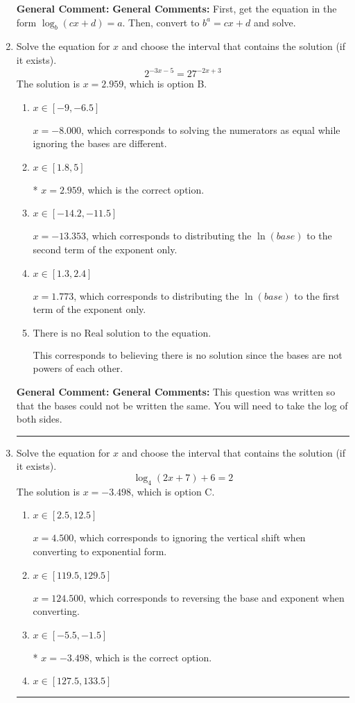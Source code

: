 \documentclass{extbook}[14pt]
\newcommand{\litem}[1]{\item #1

\rule{\textwidth}{0.4pt}}
\begin{document}
\begin{enumerate}
{\textbf{General Comment:} \textbf{General Comments:} First, get the equation in the form $\log_b{(cx+d)} = a$. Then, convert to $b^a = cx+d$ and solve.
}
\litem{
Solve the equation for $x$ and choose the interval that contains the solution (if it exists).
\[ 2^{-3x-5} = 27^{-2x+3} \]The solution is \( x = 2.959 \), which is option B.\begin{enumerate}[label=\Alph*.]
\item \( x \in [-9, -6.5] \)

$x = -8.000$, which corresponds to solving the numerators as equal while ignoring the bases are different.
\item \( x \in [1.8, 5] \)

* $x = 2.959$, which is the correct option.
\item \( x \in [-14.2, -11.5] \)

$x = -13.353$, which corresponds to distributing the $\ln(base)$ to the second term of the exponent only.
\item \( x \in [1.3, 2.4] \)

$x = 1.773$, which corresponds to distributing the $\ln(base)$ to the first term of the exponent only.
\item \( \text{There is no Real solution to the equation.} \)

This corresponds to believing there is no solution since the bases are not powers of each other.
\end{enumerate}

\textbf{General Comment:} \textbf{General Comments:} This question was written so that the bases could not be written the same. You will need to take the log of both sides.
}
\litem{
Solve the equation for $x$ and choose the interval that contains the solution (if it exists).
\[ \log_{4}{(2x+7)}+6 = 2 \]The solution is \( x = -3.498 \), which is option C.\begin{enumerate}[label=\Alph*.]
\item \( x \in [2.5, 12.5] \)

$x = 4.500$, which corresponds to ignoring the vertical shift when converting to exponential form.
\item \( x \in [119.5, 129.5] \)

$x = 124.500$, which corresponds to reversing the base and exponent when converting.
\item \( x \in [-5.5, -1.5] \)

* $x = -3.498$, which is the correct option.
\item \( x \in [127.5, 133.5] \)


\end{enumerate}}
\end{enumerate}
\end{document}
